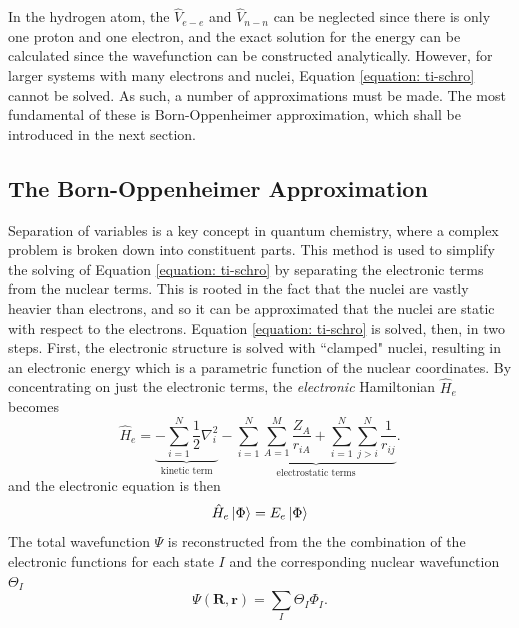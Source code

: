 In the hydrogen atom, the $\hat{V}_{e-e}$ and $\hat{V}_{n-n}$ can be neglected since there is only one proton and one electron, and the exact solution for the energy can be calculated since the wavefunction can be constructed analytically. However, for larger systems with many electrons and nuclei, Equation \ref{equation: ti-schro} cannot be solved. As such, a number of approximations must be made. The most fundamental of these is Born-Oppenheimer approximation, which shall be introduced in the next section.
\subsection{The Born-Oppenheimer Approximation}\label{section: QM_bornoppenheimer}
Separation of variables is a key concept in quantum chemistry, where a complex problem is broken down into constituent parts. This method is used to simplify the solving of Equation \ref{equation: ti-schro} by separating the electronic terms from the nuclear terms. This is rooted in the fact that the nuclei are vastly heavier than electrons, and so it can be approximated that the nuclei are static with respect to the electrons. Equation \ref{equation: ti-schro} is solved, then, in two steps. First, the electronic structure is solved with ``clamped" nuclei, resulting in an electronic energy which is a parametric function of the nuclear coordinates. By concentrating on just the electronic terms, the \textit{electronic} Hamiltonian $\hat{H}_{e}$ becomes
\begin{equation}\label{equation: Hel}
     \hat{H}_{e}=\underbrace{-\sum_{i=1}^{N}\frac{1}{2}\nabla_{i}^2}_\text{kinetic term}-\underbrace{\sum_{i=1}^{N}\sum_{A=1}^{M}\frac{Z_{A}}{r_{iA}}+\sum_{i=1}^{N}\sum_{j>{i}}^{N}\frac{1}{r_{ij}}}_\text{electrostatic terms}.
\end{equation}
and the electronic \schro{} equation is then
\begin{equation}\label{equation: ti-schro-el}
   \hat{H}_{e}\ket{\Phi}=E_{e}\ket{\Phi}
\end{equation}
The total wavefunction $\Psi$ is reconstructed from the the combination of the electronic functions for each state $I$ and the corresponding nuclear wavefunction $\Theta_{I}$
\begin{equation}
    \Psi(\bm{R},\bm{r})=\sum_{I}\Theta_{I}\Phi_{I}.
\end{equation}

